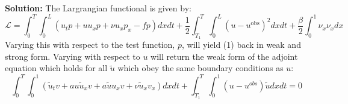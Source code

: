 \documentclass[11pt]{article}
\newenvironment{solution}{\begin{trivlist}\item[]{\bf Solution:}}
                      {\end{trivlist}}
\begin{document}
\begin{enumerate}
\begin{solution}
The Largrangian functional is given by: 
\begin{equation}
\mathcal{L} = \int_0^T \int_0^L (u_t p + u u_x p + \nu u_{x} p_x - f p) dx dt
+ \frac{1}{2}\int_{T_1}^T\int_0^L(u-u^{\text{obs}})^2dxdt  
+ \frac{\beta}{2} \int_0^1 \nu_x \nu_x dx  
\label{lagrangian}
\end{equation}
Varying this with respect to the test function, $p$, will yield (1) back
 in weak and strong form. Varying with respect to $u$ will return the
 weak form of the adjoint equation which holds for all $\tilde{u}$ which
 obey the same boundary conditions as $u$:  
\begin{equation}
\int_0^T\int_0^1\left(\tilde{u}_tv + au\tilde{u}_xv + a\tilde{u}u_xv 
		 + \nu\tilde{u}_xv_x\right)dxdt  
+ \int_{T_1}^T\int_0^1(u-u^{obs})\tilde{u}dxdt = 0 \tag{5}
\label{adjweak}  
\end{equation}

\end{solution}
\end{enumerate}



%
%
%
%
%
%

\newpage
\end{document}
